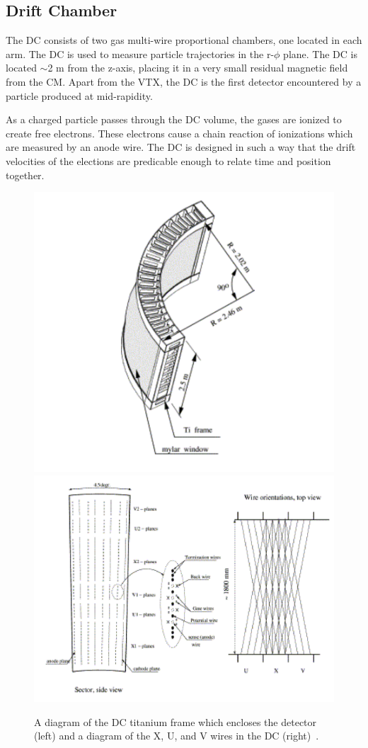 \subsection{Drift Chamber}
The DC consists of two gas multi-wire proportional chambers, one located in each arm. The DC is used to measure particle trajectories in the r-$\phi$ plane.
The DC is located $\sim$2 m from the z-axis, placing it in a very small residual magnetic field from the CM. Apart from the VTX, the DC is the first detector encountered by a particle produced at mid-rapidity. 

As a charged particle passes through the DC volume, the gases are ionized to create free electrons. These electrons cause a chain reaction of ionizations which are measured by an anode wire. The DC is designed in such a way that the drift velocities of the elections are predicable enough to relate time and position together. 

\begin{figure}[!ht]
\begin{center}
\includegraphics[width=0.45\linewidth]{figs/dc_diagram.png}
\includegraphics[width=0.45\linewidth]{figs/dc_wire_diagram.png}
\caption{A diagram of the DC titanium frame which encloses the detector (left) and a diagram of the X, U, and V wires in the DC (right)~\cite{Adcox2003469}.}
\label{fig:dc_diagram}
\end{center}
\end{figure}

